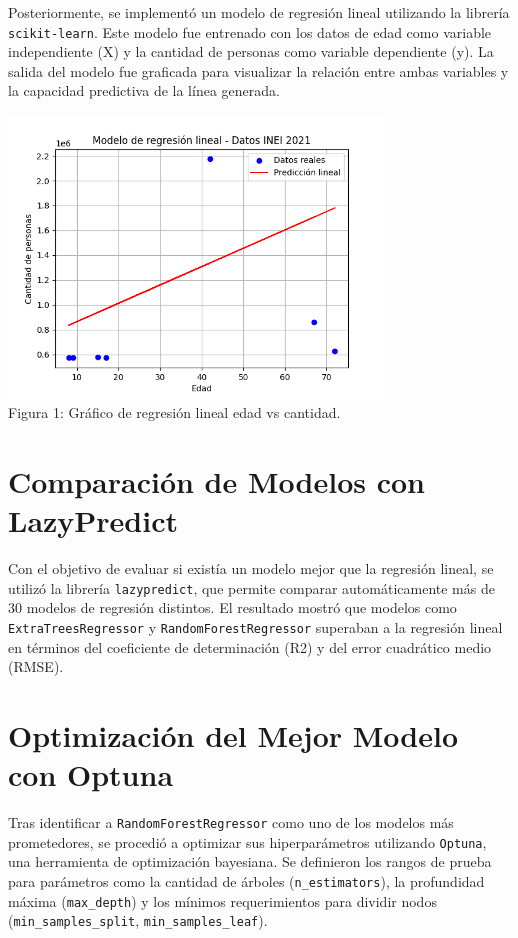 \documentclass[a4paper,10pt]{article}
\begin{document}
Posteriormente, se implementó un modelo de regresión lineal utilizando la librería \texttt{scikit-learn}. Este modelo fue entrenado con los datos de edad como variable independiente (X) y la cantidad de personas como variable dependiente (y). La salida del modelo fue graficada para visualizar la relación entre ambas variables y la capacidad predictiva de la línea generada.

\begin{center}
    \includegraphics[width=0.75\textwidth]{DatosINEI.png} \\
    \small Figura 1: Gráfico de regresión lineal edad vs cantidad.
\end{center}

\section*{Comparación de Modelos con LazyPredict}

Con el objetivo de evaluar si existía un modelo mejor que la regresión lineal, se utilizó la librería \texttt{lazypredict}, que permite comparar automáticamente más de 30 modelos de regresión distintos. El resultado mostró que modelos como \texttt{ExtraTreesRegressor} y \texttt{RandomForestRegressor} superaban a la regresión lineal en términos del coeficiente de determinación (R2) y del error cuadrático medio (RMSE).

\section*{Optimización del Mejor Modelo con Optuna}

Tras identificar a \texttt{RandomForestRegressor} como uno de los modelos más prometedores, se procedió a optimizar sus hiperparámetros utilizando \texttt{Optuna}, una herramienta de optimización bayesiana. Se definieron los rangos de prueba para parámetros como la cantidad de árboles (\texttt{n\_estimators}), la profundidad máxima (\texttt{max\_depth}) y los mínimos requerimientos para dividir nodos (\texttt{min\_samples\_split}, \texttt{min\_samples\_leaf}).
\end{document}
